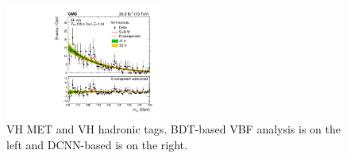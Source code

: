 \begin{figure}[h!]
\begin{center}
        \includegraphics[width=0.47\textwidth]{figures/appendix_mass_plots/SBplots_jackWSnewOldTTHVHHadronicTag_13TeV.pdf}
    \end{center}
    \caption{VH MET and VH hadronic tags. BDT-based VBF analysis is on the left and DCNN-based is on the right.}
        \label{fig:app_mass_plots:vh_met_had}
\end{figure}

